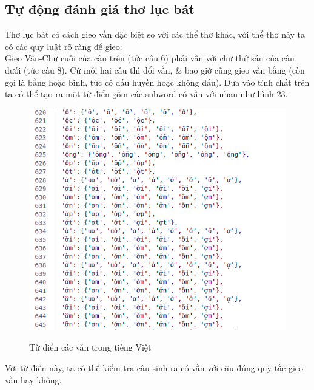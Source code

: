 \documentclass[a4paper]{article}
\theoremstyle{definition}
\begin{document}
\subsection{Tự động đánh giá thơ lục bát}
Thơ lục bát có cách gieo vần đặc biệt so với các thể thơ khác, với thể thơ này ta có các quy luật rõ ràng để gieo:\\
 Gieo Vần-Chữ cuối của câu trên (tức câu 6) phải vần với chữ thứ sáu của câu dưới (tức câu 8). Cứ mỗi hai câu thì đổi vần, & bao giờ cũng gieo vần bằng (còn gọi là bằng hoặc bình, tức có dấu huyền hoặc không dấu). Dựa vào tính chất trên ta có thể tạo ra một từ điển gồm các subword có vần với nhau như hình 23.
\begin{figure}[h!]
\begin{center}
\includegraphics[width=12cm]{24.png} \\[0.15in]

\caption{Từ điển  các vẫn trong tiếng Việt}
\end{center}
\end{figure}
\newpage 
Với từ điển này, ta có thể kiểm tra câu sinh ra có vần với câu đúng quy tắc gieo vần hay không. 
\end{document}
